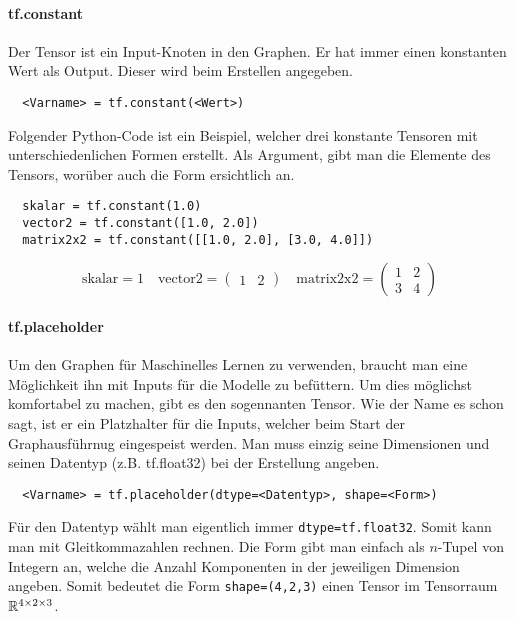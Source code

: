\paragraph{tf.constant}
Der  Tensor ist ein Input-Knoten in den Graphen.
Er hat immer einen konstanten Wert als Output. Dieser wird beim Erstellen
angegeben.
\begin{verbatim}
  <Varname> = tf.constant(<Wert>)
\end{verbatim}
\para{}
Folgender Python-Code ist ein Beispiel, welcher drei konstante Tensoren mit unterschiedenlichen
Formen erstellt. Als Argument, gibt man die Elemente des Tensors, worüber auch
die Form ersichtlich an.
\begin{verbatim}
  skalar = tf.constant(1.0)
  vector2 = tf.constant([1.0, 2.0])
  matrix2x2 = tf.constant([[1.0, 2.0], [3.0, 4.0]])
\end{verbatim}
\[\text{skalar}=1 \quad \text{vector2}=\begin{pmatrix}1&2\end{pmatrix} \quad
  \text{matrix2x2}=\begin{pmatrix}1&2\\3&4\end{pmatrix}\]

\paragraph{tf.placeholder}
Um den Graphen für Maschinelles Lernen zu verwenden, braucht man eine
Möglichkeit ihn mit Inputs für die Modelle zu befüttern. Um dies möglichst
komfortabel zu machen, gibt es den sogennanten
 Tensor. Wie der Name es schon sagt, ist er ein
Platzhalter für die Inputs, welcher beim Start der Graphausführnug eingespeist
werden. Man muss einzig seine Dimensionen und seinen Datentyp (z.B. tf.float32) bei der Erstellung angeben.
\para{}
\begin{verbatim}
  <Varname> = tf.placeholder(dtype=<Datentyp>, shape=<Form>)
\end{verbatim}
Für den Datentyp wählt man eigentlich immer
\texttt{dtype=tf.float32}. Somit kann man mit Gleitkommazahlen rechnen.
Die Form gibt man einfach als $n$-Tupel von Integern an, welche die Anzahl
Komponenten in der jeweiligen Dimension angeben. Somit bedeutet die Form
\texttt{shape=(4,2,3)} einen Tensor im Tensorraum $\mathbb{R}^{4 \times
  2 \times 3}$.

